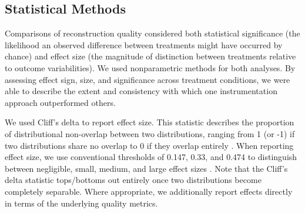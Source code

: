 
\subsection{Statistical Methods}

Comparisons of reconstruction quality considered both statistical significance (the likelihood an observed difference between treatments might have occurred by chance) and effect size (the magnitude of distinction between treatments relative to outcome variabilities).
We used nonparametric methods for both analyses.
By assessing effect sign, size, and significance across treatment conditions, we were able to describe the extent and consistency with which one instrumentation approach outperformed others.

We used Cliff's delta to report effect size.
This statistic describes the proportion of distributional non-overlap between two distributions, ranging from 1 (or -1) if two distributions share no overlap to 0 if they overlap entirely \citep{cliff1993dominance}.
When reporting effect size, we use conventional thresholds of 0.147, 0.33, and 0.474 to distinguish between negligible, small, medium, and large effect sizes \citep{hess2004robust}.
Note that the Cliff's delta statistic tops/bottoms out entirely once two distributions become completely separable.
Where appropriate, we additionally report effects directly in terms of the underlying quality metrics.

